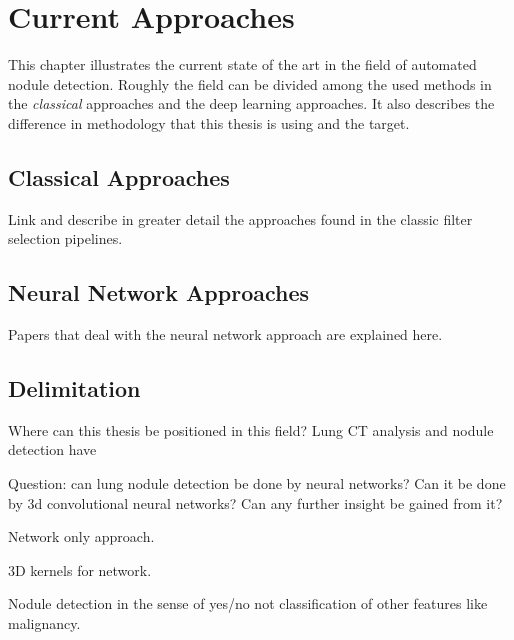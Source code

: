 \documentclass[main.tex]{subfiles}
\begin{document}
\chapter{Current Approaches}\label{chap:approaches}
This chapter illustrates the current state of the art in the field of automated nodule detection. Roughly the field can be divided among the used methods in the \emph{classical} approaches and the deep learning approaches. It also describes the difference in methodology that this thesis is using and the target.

\section{Classical Approaches}
Link and describe in greater detail the approaches found in the classic filter selection pipelines.

\section{Neural Network Approaches}
Papers that deal with the neural network approach are explained here.

\section{Delimitation}
Where can this thesis be positioned in this field? Lung CT analysis and nodule detection have 


Question: can lung nodule detection be done by neural networks? Can it be done by 3d convolutional neural networks? Can any further insight be gained from it?

Network only approach.

3D kernels for network. 

Nodule detection in the sense of yes/no not classification of other features like malignancy.
\end{document}
